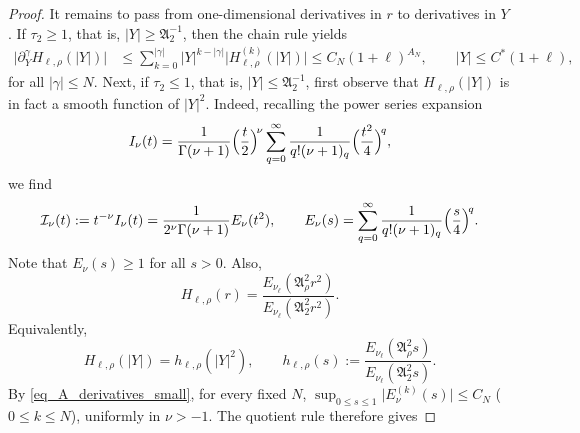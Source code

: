 \documentclass[12pt]{amsart}
\begin{document}
\begin{proof}
It remains to pass from one-dimensional derivatives in $r$ to derivatives in $Y$. If $\tau_2 \ge 1$, that is, $|Y|\ge \mathfrak A_2^{-1}$, then the chain rule yields
\begin{align*}
\bigl|\partial_Y^\gamma H_{\ell,\rho}(|Y|)\bigr|
&\le \sum_{k=0}^{|\gamma|} |Y|^{k-|\gamma|} \bigl|H_{\ell,\rho}^{(k)}(|Y|)\bigr|
\le C_N (1+\ell)^{A_N}, \qquad |Y|\le C^* (1+\ell),
\end{align*}
for all $|\gamma|\le N$. Next, if $\tau_2 \le 1$, that is, $|Y|\le \mathfrak A_2^{-1}$, first observe that $H_{\ell,\rho}(|Y|)$ is in fact a smooth function of $|Y|^2$. Indeed, recalling the power series expansion
\begin{equation*}
    I_\nu(t)
    =
    \frac{1}{\Gamma(\nu+1)}
    \Bigl(\frac{t}{2}\Bigr)^{\!\nu}
    \sum_{q=0}^{\infty}
    \frac{1}{q!(\nu+1)_q}
    \Bigl(\frac{t^2}{4}\Bigr)^{\!q},
\end{equation*}
we find
\begin{equation*}
    \mathcal I_\nu(t)
    :=
    t^{-\nu}I_\nu(t)
    =
    \frac{1}{2^\nu\Gamma(\nu+1)}
     E_\nu(t^2), \qquad  E_\nu(s)
    =
    \sum_{q=0}^{\infty}
    \frac{1}{q!(\nu+1)_q}
    \Bigl(\frac{s}{4}\Bigr)^{\!q}.
\end{equation*}
Note that $E_\nu(s) \ge 1$ for all $s>0$. Also,
\begin{equation*}
    H_{\ell,\rho}(r)
    =
    \frac{
        E_{\nu_\ell}(\mathfrak A_\rho^2 r^2)
    }{
        E_{\nu_\ell}(\mathfrak A_2^2 r^2)
    }.
\end{equation*}
Equivalently,
\begin{equation*}
    H_{\ell,\rho}(|Y|)
    =
    h_{\ell,\rho}(|Y|^2), \qquad h_{\ell,\rho}(s) :=  \frac{
        E_{\nu_\ell}(\mathfrak A_\rho^2 s)
    }{
        E_{\nu_\ell}(\mathfrak A_2^2 s)
    }.
\end{equation*}
By \eqref{eq_A_derivatives_small}, for every fixed $N$, $\sup_{0\le s\le 1}\bigl| E_\nu^{(k)}(s) \bigr| \le C_N$ ($0\le k\le N$),
uniformly in $\nu> -1$. The quotient rule therefore gives

\end{proof}
\end{document}
